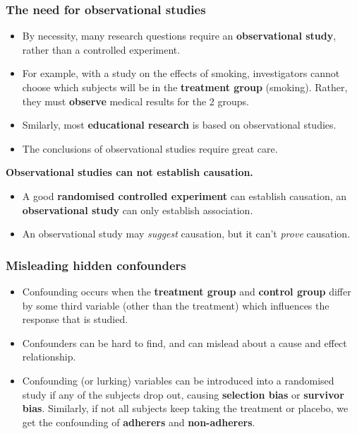 \documentclass[a4paper]{article}
\begin{document}
\subsubsection{The need for observational studies}
\begin{itemize}
	\item By necessity, many research questions require an \textbf{observational study}, rather than a controlled experiment.
	\item For example, with a study on the effects of smoking, investigators cannot choose which subjects will be in the \textbf{\textcolor{mygreen}{treatment group}} (smoking). Rather, they must \textbf{observe} medical results for the 2 groups.
	\item Smilarly, most \textbf{educational research} is based on observational studies.
	\item The conclusions of observational studies require great care.
\end{itemize}
\begin{goldbox}
	\textbf{Observational studies can not establish causation.}
\end{goldbox}
\begin{itemize}
\item A good \textbf{randomised controlled experiment} can establish causation, an \textbf{observational study} can only establish association.
\item An observational study may \textit{suggest} causation, but it can't \textit{prove} causation.
\end{itemize}
\subsubsection{Misleading hidden confounders}
\begin{itemize}
	\item Confounding occurs when the \textbf{\textcolor{mygreen}{treatment group}} and \textbf{\textcolor{myred}{control group}} differ by some third variable (other than the treatment) which influences the response that is studied.
	\item Confounders can be hard to find, and can mislead about a cause and effect relationship.
	\item Confounding (or lurking) variables can be introduced into a randomised study if any of the subjects drop out, causing \textbf{selection bias} or \textbf{survivor bias}. Similarly, if not all subjects keep taking the treatment or placebo, we get the confounding of \textbf{adherers} and \textbf{non-adherers}.
\end{itemize}
\end{document}
